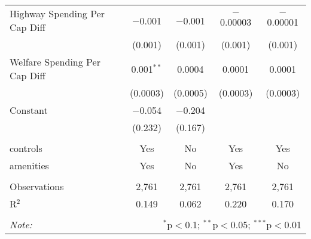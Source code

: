 \begin{table}[!htbp]
\begin{tabular}{@{\extracolsep{5pt}}lcccc}
  Highway Spending Per Cap Diff & $-$0.001 & $-$0.001 & $-$0.00003 & $-$0.00001 \\ 
  & (0.001) & (0.001) & (0.001) & (0.001) \\ 
  Welfare Spending Per Cap Diff & 0.001$^{**}$ & 0.0004 & 0.0001 & 0.0001 \\ 
  & (0.0003) & (0.0005) & (0.0003) & (0.0003) \\ 
  Constant & $-$0.054 & $-$0.204 &  &  \\ 
  & (0.232) & (0.167) &  &  \\ 
 \hline \\[-1.8ex] 
controls & Yes & No & Yes & Yes \\ 
amenities & Yes & No & Yes & No \\ 
\hline \\[-1.8ex] 
Observations & 2,761 & 2,761 & 2,761 & 2,761 \\ 
R$^{2}$ & 0.149 & 0.062 & 0.220 & 0.170 \\ 
\hline 
\hline \\[-1.8ex] 
\textit{Note:}  & \multicolumn{4}{r}{$^{*}$p$<$0.1; $^{**}$p$<$0.05; $^{***}$p$<$0.01} \\ 
\end{tabular} 
\end{table} 
